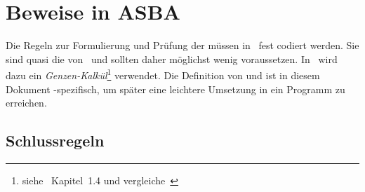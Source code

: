 \section{Beweise in ASBA}%
\label{sec:BeweiseASBA}

Die Regeln zur Formulierung und Prüfung der  müssen in \ASBA\ fest codiert werden.
Sie sind quasi die  von \ASBA\ und sollten daher möglichst wenig voraussetzen.
In \ASBA\ wird dazu ein \emph{Genzen-Kalkül}\footnote{%
	siehe~\cite{bib:Rautenberg} Kapitel~1.4 und vergleiche~\cite{bib:Schlussregel,bib:NatuerlichesSchliessen}%
} verwendet.
Die Definition von \emph{} und \emph{} ist in diesem Dokument \ASBA-spezifisch, um später eine leichtere Umsetzung in ein Programm zu erreichen.

\subsection{Schlussregeln}%
\label{sub:Schlussregeln}

